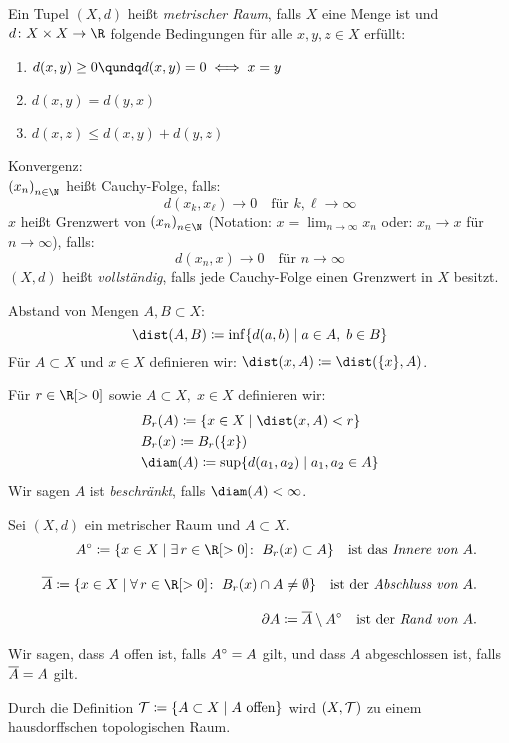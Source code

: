 \begin{thEmpty}[Metrik]
    Ein Tupel $(X,d)$ heißt \emph{metrischer Raum}, falls $X$ eine Menge ist 
    und $d\colon X\times X\to\R$ folgende Bedingungen für alle $x,y,z\in X$ erfüllt:
    \begin{enumerate}[({M}1),labelsep=1em,leftmargin=2cm]
        \item
            $d(x,y)\geq 0 \qundq d(x,y) = 0 \iff x=y$
        \item
            $d(x,y) = d(y,x)$
        \item
            $d(x,z)\leq d(x,y)+d(y,z)$
    \end{enumerate}
    
    Konvergenz:\\
    $\nSeq x$ heißt Cauchy-Folge, falls:
    \[ d(x_k,x_\ell) \to 0 \quad\text{für } k,\ell\to\infty \]
    $x$ heißt Grenzwert von $\nSeq x$ (Notation:
    $x=\lim_{n\to\infty} x_n$ oder: $x_n\to x$ für $n\to\infty$), falls:
    \[ d(x_n,x)\to 0 \quad\text{für } n\to\infty \]
    $(X,d)$ heißt \emph{vollständig}, falls jede Cauchy-Folge einen Grenzwert in
    $X$ besitzt.
    
    Abstand von Mengen $A,B\subset X$:
    \[ \dist(A,B) \defeq \inf \{ d(a,b) \Mid a\in A,\; b\in B \} \]
    Für $A\subset X$ und $x\in X$ definieren wir: $\dist(x,A) \defeq
    \dist(\{x\},A)$.
    
    Für $r\in\R[>0]$ sowie $A\subset X,\;x\in X$ definieren wir:
    \begin{align*}
        & B_r(A) \defeq \{ x\in X \Mid \dist(x,A) < r \}    \\
        & B_r(x) \defeq B_r(\{x\})                          \\
        & \diam(A) \defeq \sup \{ d(a_1,a_2) \Mid a_1,a_2\in A \}
    \end{align*}
    Wir sagen $A$ ist \emph{beschränkt}, falls $\diam(A)<\infty$.
\end{thEmpty}

\begin{thEmpty}\label{vl01:topometrik}
    Sei $(X,d)$ ein metrischer Raum und $A\subset X$.
    \begin{align*}
        \setinterior A \defeq \{ x\in X \Mid \exists\,r\in\R[>0]\colon\;
        B_r(x) \subset A \}
        \quad\text{ist das \emph{Innere von $A$}}.
        \\[2ex]
        \setclosure A \defeq \{ x\in X \Mid \forall\,r\in\R[>0]\colon\;
        B_r(x) \cap A \neq \emptyset \}
        \quad\text{ist der \emph{Abschluss von $A$}}.
        \\[2ex]
        \setboundary A \defeq \setclosure A \setminus \setinterior A
        \quad\text{ist der \emph{Rand von $A$}}.
    \end{align*}
    
    Wir sagen, dass $A$ offen ist, falls $A^\circ = A$ gilt,
    und dass $A$ abgeschlossen ist, falls $\overline{A} = A$ gilt.
    
    Durch die Definition $\Topo \defeq \{ A\subset X \Mid A\text{ offen} \}$
    wird $(X,\operatorname{\mathcal{T}})$ zu einem hausdorffschen topologischen Raum.
\end{thEmpty}
